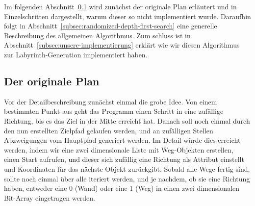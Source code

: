 Im folgenden Abschnitt~\ref{subsec:der-originale-plan} wird zunächst der originale Plan erläutert und in Einzelschritten dargestellt, warum dieser so nicht implementiert wurde.
Daraufhin folgt in Abschnitt~\ref{subsec:randomized-depth-first-search} eine generelle Beschreibung des allgemeinen  Algorithmus.
Zum schluss ist in Abschnitt~\ref{subsec:unsere-implementierung} erklärt wie wir diesen Algorithmus zur Labyrinth-Generation implementiert haben.
\subsection{Der originale Plan}\label{subsec:der-originale-plan}
Vor der Detailbeschreibung zunächst einmal die grobe Idee.
Von einem bestimmten Punkt aus geht das Programm einen Schritt in eine zufällige Richtung, bis es das Ziel in der Mitte erreicht hat.
Danach soll noch einmal durch den nun erstellten Zielpfad gelaufen werden, und an zufälligen Stellen Abzweigungen vom Hauptpfad generiert werden.
Im Detail würde dies erreicht werden, indem wir eine zwei dimensionale Liste mit Weg-Objekten erstellen, einen Start aufrufen, und dieser sich zufällig eine Richtung als Attribut einstellt und Koordinaten für das nächste Objekt zurückgibt.
Sobald alle Wege fertig sind, sollte noch einmal über alle iteriert werden, und je nachdem, ob sie eine Richtung haben, entweder eine 0 (Wand) oder eine 1 (Weg) in einen zwei dimensionalen Bit-Array eingetragen werden.

